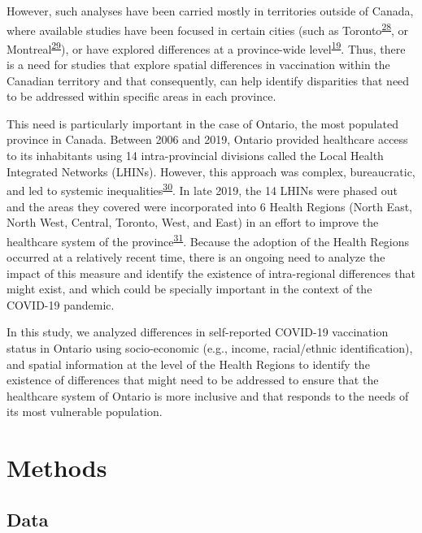 \documentclass[
  letterpaper,
  DIV=11,
  numbers=noendperiod]{scrartcl}
\begin{document}
However, such analyses have been carried mostly in territories outside
of Canada, where available studies have been focused in certain cities
(such as Toronto\textsuperscript{\protect\hyperlink{ref-choi2021}{28}},
or Montreal\textsuperscript{\protect\hyperlink{ref-mckinnon2021}{29}}),
or have explored differences at a province-wide
level\textsuperscript{\protect\hyperlink{ref-guay2022}{19}}. Thus, there
is a need for studies that explore spatial differences in vaccination
within the Canadian territory and that consequently, can help identify
disparities that need to be addressed within specific areas in each
province.

This need is particularly important in the case of Ontario, the most
populated province in Canada. Between 2006 and 2019, Ontario provided
healthcare access to its inhabitants using 14 intra-provincial divisions
called the Local Health Integrated Networks (LHINs). However, this
approach was complex, bureaucratic, and led to systemic
inequalities\textsuperscript{\protect\hyperlink{ref-tsasis2012}{30}}. In
late 2019, the 14 LHINs were phased out and the areas they covered were
incorporated into 6 Health Regions (North East, North West, Central,
Toronto, West, and East) in an effort to improve the healthcare system
of the province\textsuperscript{\protect\hyperlink{ref-dong2022}{31}}.
Because the adoption of the Health Regions occurred at a relatively
recent time, there is an ongoing need to analyze the impact of this
measure and identify the existence of intra-regional differences that
might exist, and which could be specially important in the context of
the COVID-19 pandemic.

In this study, we analyzed differences in self-reported COVID-19
vaccination status in Ontario using socio-economic (e.g., income,
racial/ethnic identification), and spatial information at the level of
the Health Regions to identify the existence of differences that might
need to be addressed to ensure that the healthcare system of Ontario is
more inclusive and that responds to the needs of its most vulnerable
population.

\hypertarget{methods}{%
\section{Methods}\label{methods}}

\hypertarget{sec-data}{%
\subsection{Data}\label{sec-data}}
\end{document}
